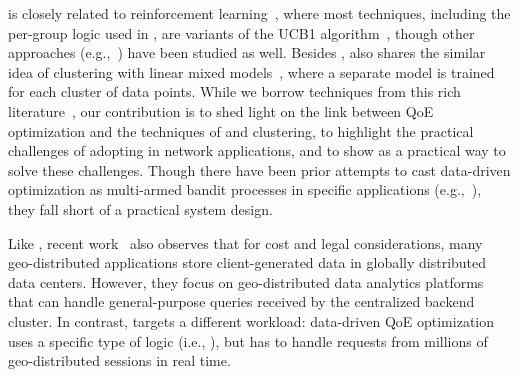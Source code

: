 \mab is closely related to reinforcement learning~\cite{mab}, where most techniques, including the per-group \mab logic used in \name, are variants of the UCB1 algorithm~\cite{ucb1}, though other approaches (e.g.,~\cite{agarwal2014taming}) have been studied as well. 
Besides \mab, \name also shares the similar idea of clustering with linear mixed models~\cite{mcculloch2001generalized}, where a separate model is trained for each cluster of data points.
While we  borrow  techniques from this rich literature~\cite{discounteducb,regressogram-ucb}, our contribution is to shed light on the link between QoE optimization and the techniques of \mab and clustering, to highlight the practical challenges of adopting \mab in network applications, and to show \idea as a practical way to solve these challenges.
Though there have been prior attempts to cast data-driven optimization as multi-armed bandit processes in specific applications (e.g.,~\cite{via}), they fall short of a practical system design.

Like \name, recent work~\cite{iris,jetstream,geode} also observes that for cost and legal considerations, many geo-distributed applications store client-generated data in globally distributed data centers. However, they focus on geo-distributed data analytics platforms that can handle general-purpose queries received by the centralized backend cluster.
In contrast, \name targets a different workload: data-driven QoE optimization uses a specific type of logic (i.e., \mab), but has to handle requests from millions of geo-distributed sessions in real time.

